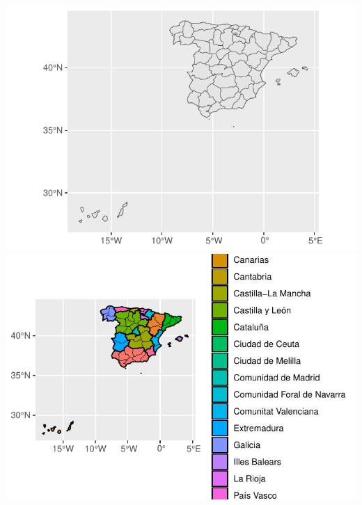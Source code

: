 \documentclass[data,article,submit,moreauthors,pdftex]{Definitions/mdpi}
\begin{document}
\includegraphics{ProyectoAED2024_Rmd_files/figure-latex/unnamed-chunk-47-1}
\includegraphics{ProyectoAED2024_Rmd_files/figure-latex/unnamed-chunk-47-2}


\vspace{6pt}


\end{document}
